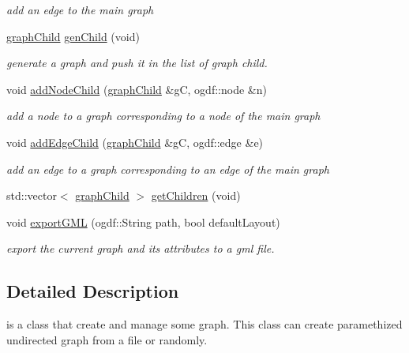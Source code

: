 \begin{DoxyCompactItemize}
\begin{DoxyCompactList}\small\item\em add an edge to the main graph \end{DoxyCompactList}\item 
\hyperlink{structgraphChild}{graph\-Child} \hyperlink{classGraphManager_a9433db8c77f8c9bd4744a35c7c553928}{gen\-Child} (void)
\begin{DoxyCompactList}\small\item\em generate a graph and push it in the list of graph child. \end{DoxyCompactList}\item 
void \hyperlink{classGraphManager_a6732352df1ad2fa1e6953759e960918d}{add\-Node\-Child} (\hyperlink{structgraphChild}{graph\-Child} \&g\-C, ogdf\-::node \&n)
\begin{DoxyCompactList}\small\item\em add a node to a graph corresponding to a node of the main graph \end{DoxyCompactList}\item 
void \hyperlink{classGraphManager_a9888881ba43a607e73791ddddad4444b}{add\-Edge\-Child} (\hyperlink{structgraphChild}{graph\-Child} \&g\-C, ogdf\-::edge \&e)
\begin{DoxyCompactList}\small\item\em add an edge to a graph corresponding to an edge of the main graph \end{DoxyCompactList}\item 
std\-::vector$<$ \hyperlink{structgraphChild}{graph\-Child} $>$ \hyperlink{classGraphManager_a24cc3fef7b6609b81f27977aa7924426}{get\-Children} (void)
\item 
void \hyperlink{classGraphManager_a1b15356c020e8d8e88d3910be51ed7e8}{export\-G\-M\-L} (ogdf\-::\-String path, bool default\-Layout)
\begin{DoxyCompactList}\small\item\em export the current graph and its attributes to a gml file. \end{DoxyCompactList}\end{DoxyCompactItemize}


\subsection{Detailed Description}
is a class that create and manage some graph. This class can create paramethized undirected graph from a file or randomly. 

